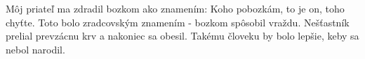 Môj priateľ ma zdradil bozkom ako znamením: Koho pobozkám, to je on, toho chyťte. Toto bolo zradcovským znamením - bozkom spôsobil vraždu.
\versseparator
Nešťastník prelial prevzácnu krv a nakoniec sa obesil.
\versseparator
Takému človeku by bolo lepšie, keby sa nebol narodil.
